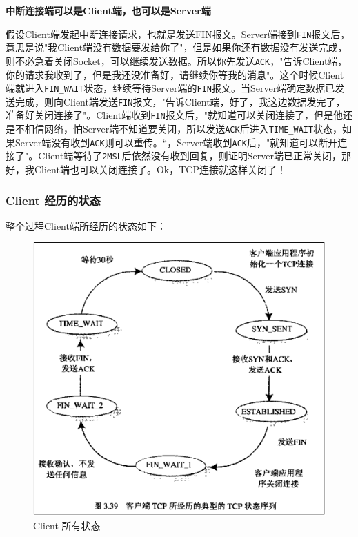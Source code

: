 \documentclass[UTF8,a4paper,12pt]{ctexbook}
\begin{document}
			\textbf{中断连接端可以是Client端，也可以是Server端}
			
			假设Client端发起中断连接请求，也就是发送FIN报文。Server端接到\verb|FIN|报文后，意思是说"我Client端没有数据要发给你了"，但是如果你还有数据没有发送完成，则不必急着关闭Socket，可以继续发送数据。所以你先发送\verb|ACK|，"告诉Client端，你的请求我收到了，但是我还没准备好，请继续你等我的消息"。这个时候Client端就进入\verb|FIN_WAIT|状态，继续等待Server端的\verb|FIN|报文。当Server端确定数据已发送完成，则向Client端发送\verb|FIN|报文，"告诉Client端，好了，我这边数据发完了，准备好关闭连接了"。Client端收到\verb|FIN|报文后，"就知道可以关闭连接了，但是他还是不相信网络，怕Server端不知道要关闭，所以发送\verb|ACK|后进入\verb|TIME_WAIT|状态，如果Server端没有收到\verb|ACK|则可以重传。“，Server端收到\verb|ACK|后，"就知道可以断开连接了"。Client端等待了\verb|2MSL|后依然没有收到回复，则证明Server端已正常关闭，那好，我Client端也可以关闭连接了。Ok，TCP连接就这样关闭了！
			
			\subsubsection{Client 经历的状态}
				整个过程Client端所经历的状态如下：
				\begin{figure}[ht]
					\centering
					\includegraphics[scale = 0.7]{figures/Client-status.png}
					\caption{Client 所有状态}
					\label{clientStatus}
				\end{figure}
			
\end{document}
